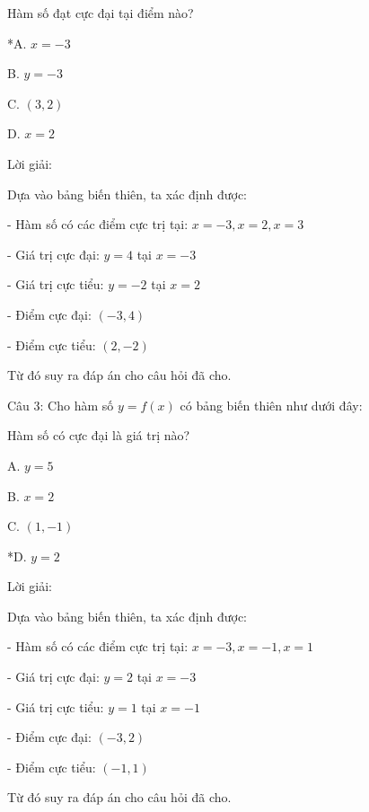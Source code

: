 \documentclass[a4paper,12pt]{article}
\begin{document}
Hàm số đạt cực đại tại điểm nào?

*A. \(x=-3\)

B. \(y=-3\)

C. \((3,2)\)

D. \(x=2\)

Lời giải:


Dựa vào bảng biến thiên, ta xác định được:

- Hàm số có các điểm cực trị tại: \(x = -3, x = 2, x = 3\)

- Giá trị cực đại: \(y = 4\) tại \(x = -3\)

- Giá trị cực tiểu: \(y = -2\) tại \(x = 2\)

- Điểm cực đại: \((-3, 4)\)

- Điểm cực tiểu: \((2, -2)\)

Từ đó suy ra đáp án cho câu hỏi đã cho.




Câu 3: Cho hàm số \(y=f(x)\) có bảng biến thiên như dưới đây:




Hàm số có cực đại là giá trị nào?

A. \(y=5\)

B. \(x=2\)

C. \((1,-1)\)

*D. \(y=2\)

Lời giải:


Dựa vào bảng biến thiên, ta xác định được:

- Hàm số có các điểm cực trị tại: \(x = -3, x = -1, x = 1\)

- Giá trị cực đại: \(y = 2\) tại \(x = -3\)

- Giá trị cực tiểu: \(y = 1\) tại \(x = -1\)

- Điểm cực đại: \((-3, 2)\)

- Điểm cực tiểu: \((-1, 1)\)

Từ đó suy ra đáp án cho câu hỏi đã cho.
\end{document}
